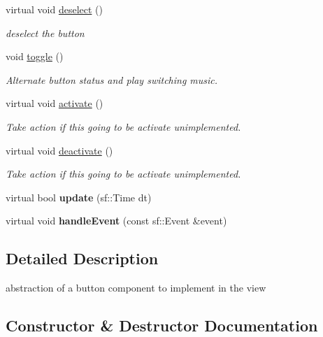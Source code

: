 \begin{DoxyCompactItemize}
\mbox{\label{classButton_a565331dbe481e0f55e26a4a1f36ee40e}} 
virtual void \hyperlink{classButton_a565331dbe481e0f55e26a4a1f36ee40e}{deselect} ()
\begin{DoxyCompactList}\small\item\em deselect the button \end{DoxyCompactList}\item 
\mbox{\label{classButton_a78bc21a32f143adf0de1204e6f230629}} 
void \hyperlink{classButton_a78bc21a32f143adf0de1204e6f230629}{toggle} ()
\begin{DoxyCompactList}\small\item\em Alternate button status and play switching music. \end{DoxyCompactList}\item 
virtual void \hyperlink{classButton_a2fe7d7228fb882c5c992ed07341d45be}{activate} ()
\begin{DoxyCompactList}\small\item\em Take action if this going to be activate unimplemented. \end{DoxyCompactList}\item 
virtual void \hyperlink{classButton_a57efb09b51a4846a25e7f61abee78cd6}{deactivate} ()
\begin{DoxyCompactList}\small\item\em Take action if this going to be activate unimplemented. \end{DoxyCompactList}\item 
\mbox{\label{classButton_ac0c49438494d666916359871ce76f541}} 
virtual bool {\bfseries update} (sf\+::\+Time dt)
\item 
\mbox{\label{classButton_a1c97f0b778e1b6cb45818b3573b71487}} 
virtual void {\bfseries handle\+Event} (const sf\+::\+Event \&event)
\end{DoxyCompactItemize}


\subsection{Detailed Description}
abstraction of a button component to implement in the view 

\subsection{Constructor \& Destructor Documentation}
\mbox{\label{classButton_a421ba03df1f2038625a179d72ade06a8}} 
